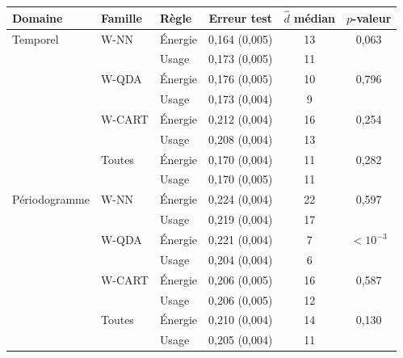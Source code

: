 \begin{tabular}{@{}lllccc@{}}
\toprule
Domaine & Famille & Règle & Erreur test & $\hat d$ médian & $p$-valeur \\
\midrule
Temporel & W-NN & Énergie & 0{,}164 (0{,}005) & 13 & 0{,}063 \\
 &  & Usage & 0{,}173 (0{,}005) & 11 &  \\
 & W-QDA & Énergie & 0{,}176 (0{,}005) & 10 & 0{,}796 \\
 &  & Usage & 0{,}173 (0{,}004) & 9 &  \\
 & W-CART & Énergie & 0{,}212 (0{,}004) & 16 & 0{,}254 \\
 &  & Usage & 0{,}208 (0{,}004) & 13 &  \\
 & Toutes & Énergie & 0{,}170 (0{,}004) & 11 & 0{,}282 \\
 &  & Usage & 0{,}170 (0{,}005) & 11 &  \\
\midrule
Périodogramme & W-NN & Énergie & 0{,}224 (0{,}004) & 22 & 0{,}597 \\
 &  & Usage & 0{,}219 (0{,}004) & 17 &  \\
 & W-QDA & Énergie & 0{,}221 (0{,}004) & 7 & $<10^{-3}$ \\
 &  & Usage & 0{,}204 (0{,}004) & 6 &  \\
 & W-CART & Énergie & 0{,}206 (0{,}005) & 16 & 0{,}587 \\
 &  & Usage & 0{,}206 (0{,}005) & 12 &  \\
 & Toutes & Énergie & 0{,}210 (0{,}004) & 14 & 0{,}130 \\
 &  & Usage & 0{,}205 (0{,}004) & 11 &  \\
\bottomrule
\end{tabular}
